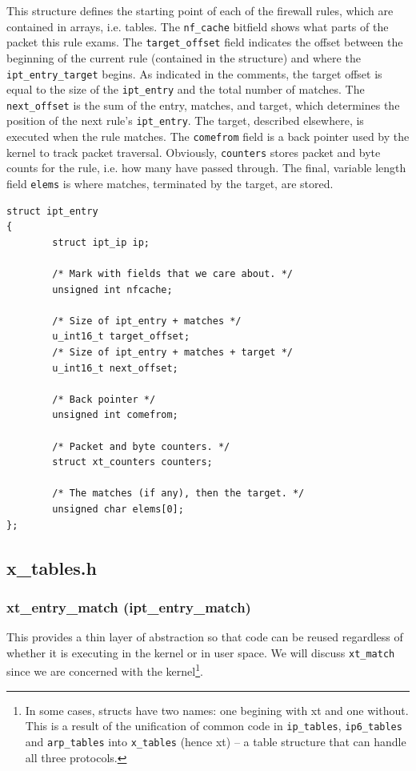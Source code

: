 \documentclass[a4paper,10pt]{article}
\newcommand{\code}[1]{\texttt{#1}}
\begin{document}
This structure defines the starting point of each of the firewall
rules, which are contained in arrays, i.e. tables.  The
\code{nf\_cache} bitfield shows what parts of the packet this rule
exams. The \code{target\_offset} field indicates the offset between
the beginning of the current rule (contained in the structure) and
where the \code{ipt\_entry\_target} begins. As indicated in the
comments, the target offset is equal to the size of the
\code{ipt\_entry} and the total number of matches. The
\code{next\_offset} is the sum of the entry, matches, and target,
which determines the position of the next rule's
\code{ipt\_entry}. The target, described elsewhere, is executed when
the rule matches. The \code{comefrom} field is a back pointer used by
the kernel to track packet traversal. Obviously, \code{counters}
stores packet and byte counts for the rule, i.e. how many have passed
through. The final, variable length field \code{elems} is where matches,
terminated by the target, are stored.

\begin{lstlisting}
struct ipt_entry
{
        struct ipt_ip ip;

        /* Mark with fields that we care about. */
        unsigned int nfcache;

        /* Size of ipt_entry + matches */
        u_int16_t target_offset;
        /* Size of ipt_entry + matches + target */
        u_int16_t next_offset;

        /* Back pointer */
        unsigned int comefrom;

        /* Packet and byte counters. */
        struct xt_counters counters;

        /* The matches (if any), then the target. */
        unsigned char elems[0];
};
\end{lstlisting}

\subsection{x\_tables.h}

\subsubsection{xt\_entry\_match (ipt\_entry\_match)}

This provides a thin layer of abstraction so that code can be reused
regardless of whether it is executing in the kernel or in user
space. We will discuss \code{xt\_match} since we are concerned with
the kernel\footnote{In some cases, structs have two names: one begining with xt and one
without. This is a result of the unification of common code in
\code{ip\_tables}, \code{ip6\_tables} and \code{arp\_tables} into \code{x\_tables} (hence xt) -- a table
structure that can handle all three protocols.}.
\end{document}
